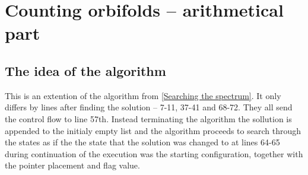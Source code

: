 \chapter{Counting orbifolds -- arithmetical part}\label{Counting orbifolds -- arithmetical part}





\section{The idea of the algorithm}
This is an extention of the algorithm from \ref{Searching the spectrum}. It only differs by 
lines after finding the solution -- 7-11, 37-41 and 68-72. They all send the control flow 
to line 57th.
Instead terminating the algorithm the sollution is appended to the 
initialy empty list and the algorithm proceeds to search through the states as if the 
the state that the solution was changed to 
at lines 64-65 during continuation of the execution was  
the starting configuration, together with the pointer placement and flag value. 

